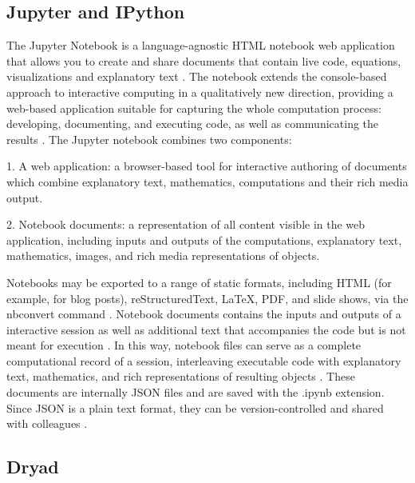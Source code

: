     \pv

\subsection{Jupyter and IPython}

    The Jupyter Notebook is a language-agnostic HTML notebook web
    application that allows you to create and share documents that
    contain live code, equations, visualizations and explanatory
    text \cite{www-jupyter-1}. The notebook extends the console-based
    approach to interactive computing in a qualitatively new
    direction, providing a web-based application suitable for
    capturing the whole computation process: developing, documenting,
    and executing code, as well as communicating the
    results \cite{www-jupyter-2}. The Jupyter notebook combines two
    components:
    
    1. A web application: a browser-based tool for interactive
    authoring of documents which combine explanatory text,
    mathematics, computations and their rich media output.

    2. Notebook documents: a representation of all content visible in
    the web application, including inputs and outputs of the
    computations, explanatory text, mathematics, images, and rich
    media representations of objects.

    Notebooks may be exported to a range of static formats, including
    HTML (for example, for blog posts), reStructuredText, LaTeX, PDF,
    and slide shows, via the nbconvert command \cite{www-jupyter-3}.
    Notebook documents contains the inputs and outputs of a
    interactive session as well as additional text that accompanies
    the code but is not meant for execution \cite{www-jupyter-4}. In
    this way, notebook files can serve as a complete computational
    record of a session, interleaving executable code with explanatory
    text, mathematics, and rich representations of resulting
    objects \cite{www-jupyter-5}. These documents are internally JSON
    files and are saved with the .ipynb extension. Since JSON is a
    plain text format, they can be version-controlled and shared with
    colleagues \cite{www-jupyter-6}.

\subsection{Dryad}

